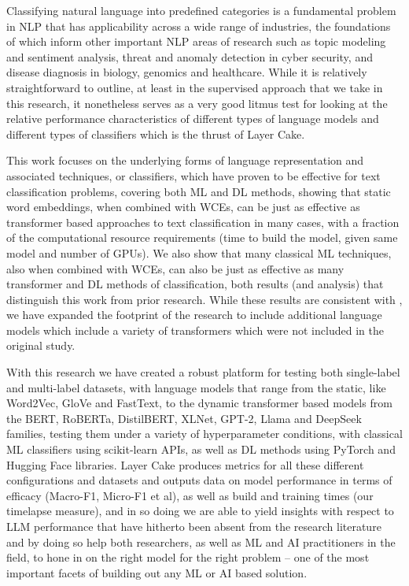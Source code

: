 \documentclass[final]{clv2025}
\begin{document}
Classifying natural language into predefined categories is a fundamental problem in NLP that has applicability across a wide range of industries, the foundations of which inform other important NLP areas of research such as topic modeling and sentiment analysis, threat and anomaly detection in cyber security, and disease diagnosis in biology, genomics and healthcare. While it is relatively straightforward to outline, at least in the supervised approach that we take in this research, it nonetheless serves as a very good litmus test for looking at the relative performance characteristics of different types of language models and different types of classifiers which is the thrust of Layer Cake.

This work focuses on the underlying forms of language representation and associated techniques, or classifiers, which have proven to be effective for text classification problems, covering both ML and DL methods, showing that static word embeddings, when combined with WCEs, can be just as effective as transformer based approaches to text classification in many cases, with a fraction of the computational resource requirements (time to build the model, given same model and number of GPUs). We also show that many classical ML techniques, also when combined with WCEs, can also be just as effective as many transformer and DL methods of classification, both results (and analysis) that distinguish this work from prior research. While these results are consistent with \cite{moreo}, we have expanded the footprint of the research to include additional language models which include a variety of transformers which were not included in the original study.

With this research we have created a robust platform for testing both single-label and multi-label datasets, with language models that range from the static, like Word2Vec, GloVe and FastText, to the dynamic transformer based models from the BERT, RoBERTa, DistilBERT, XLNet, GPT-2, Llama and DeepSeek families, testing them under a variety of hyperparameter conditions, with classical ML classifiers using scikit-learn APIs, as well as DL methods using PyTorch and Hugging Face libraries. Layer Cake produces metrics for all these different configurations and datasets and outputs data on model performance in terms of efficacy (Macro-F1, Micro-F1 et al), as well as build and training times (our timelapse measure), and in so doing we are able to yield insights with respect to LLM performance that have hitherto been absent from the research literature and by doing so help both researchers, as well as ML and AI practitioners in the field, to hone in on the right model for the right problem – one of the most important facets of building out any ML or AI based solution.
\end{document}
